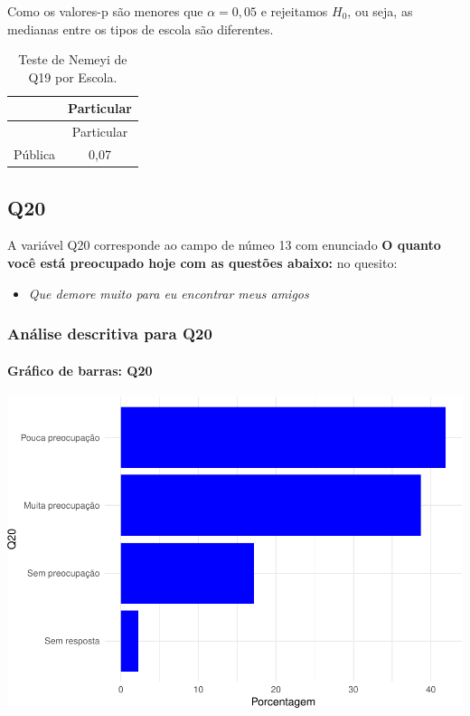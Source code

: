 \documentclass[]{article}
\providecommand{\tightlist}{%
  \setlength{\itemsep}{0pt}\setlength{\parskip}{0pt}}
\let\oldparagraph\paragraph
\renewcommand{\paragraph}[1]{\oldparagraph{#1}\mbox{}}
\begin{document}
Como os valores-p são menores que \(\alpha=0,05\) e rejeitamos \(H_0\), ou seja, as medianas entre os tipos de escola são diferentes.

\begin{longtable}[]{@{}lc@{}}
\caption{\label{tab:unnamed-chunk-284}Teste de Nemeyi de Q19 por Escola.}\tabularnewline
\toprule
& Particular\tabularnewline
\midrule
\endfirsthead
\toprule
& Particular\tabularnewline
\midrule
\endhead
Pública & 0,07\tabularnewline
\bottomrule
\end{longtable}

\cleardoublepage

\hypertarget{q20}{%
\subsection{Q20}\label{q20}}

A variável Q20 corresponde ao campo de númeo 13 com enunciado \textbf{O quanto você está preocupado hoje com as questões abaixo:} no quesito:

\begin{itemize}
\tightlist
\item
  \emph{Que demore muito para eu encontrar meus amigos}
\end{itemize}

\hypertarget{anuxe1lise-descritiva-para-q20}{%
\subsubsection{Análise descritiva para Q20}\label{anuxe1lise-descritiva-para-q20}}

\hypertarget{gruxe1fico-de-barras-q20}{%
\paragraph{Gráfico de barras: Q20}\label{gruxe1fico-de-barras-q20}}

\begin{center}\includegraphics[width=0.75\linewidth]{relatorio_files/figure-latex/unnamed-chunk-285-1} \end{center}
\end{document}
